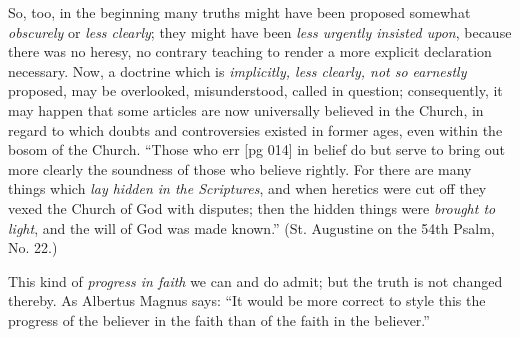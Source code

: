 So, too, in the beginning many truths might have
been proposed somewhat \emph{obscurely} or \emph{less clearly};
they might have been \emph{less urgently insisted upon},
because there was no heresy, no contrary teaching
to render a more explicit declaration necessary.
Now, a doctrine which is \emph{implicitly, less clearly,
not so earnestly} proposed, may be overlooked, misunderstood,
called in question; consequently, it
may happen that some articles are now universally
believed in the Church, in regard to which doubts
and controversies existed in former ages, even
within the bosom of the Church. “Those who err
[pg 014]
in belief do but serve to bring out more clearly the
soundness of those who believe rightly. For there
are many things which \emph{lay hidden in the Scriptures},
and when heretics were cut off they vexed
the Church of God with disputes; then the hidden
things were \emph{brought to light}, and the will of God
was made known.” (St. Augustine on the 54th
Psalm, No. 22.)

This kind of \emph{progress in faith} we can and do
admit; but the truth is not changed thereby. As
Albertus Magnus says: “It would be more correct
to style this the progress of the believer in the
faith than of the faith in the believer.”

